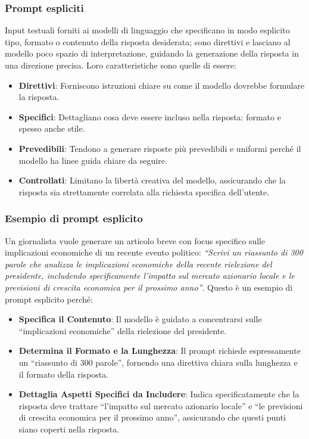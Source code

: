         \subsubsection{Prompt espliciti}
            Input testuali forniti ai modelli di linguaggio che specificano in modo esplicito tipo, formato o contenuto della risposta desiderata; sono direttivi e lasciano al modello poco spazio di interpretazione, guidando la generazione della risposta in una direzione precisa. Loro caratteristiche sono quelle di essere:
            \begin{itemize}
                \item \textbf{Direttivi}: Forniscono istruzioni chiare su come il modello dovrebbe formulare la risposta.

                \item \textbf{Specifici}: Dettagliano cosa deve essere incluso nella risposta: formato e spesso anche stile.
                
                \item \textbf{Prevedibili}: Tendono a generare risposte più prevedibili e uniformi perché il modello ha linee guida chiare da seguire.
                
                \item \textbf{Controllati}: Limitano la libertà creativa del modello, assicurando che la risposta sia strettamente correlata alla richiesta specifica dell'utente.
            \end{itemize}
            
        \subsubsection{Esempio di prompt esplicito}
            Un giornalista vuole generare un articolo breve con focus specifico sulle implicazioni economiche di un recente evento politico: \textit{``Scrivi un riassunto di 300 parole che analizza le implicazioni economiche della recente rielezione del presidente, includendo specificamente l'impatto sul mercato azionario locale e le previsioni di crescita economica per il prossimo anno''}. Questo è un esempio di prompt esplicito perché:
            \begin{itemize}
                \item \textbf{Specifica il Contenuto}: Il modello è guidato a concentrarsi sulle ``implicazioni economiche'' della rielezione del presidente.
            
                \item \textbf{Determina il Formato e la Lunghezza}: Il prompt richiede espressamente un ``riassunto di 300 parole'', fornendo una direttiva chiara sulla lunghezza e il formato della risposta.
            
                \item \textbf{Dettaglia Aspetti Specifici da Includere}: Indica specificatamente che la risposta deve trattare ``l'impatto sul mercato azionario locale'' e ``le previsioni di crescita economica per il prossimo anno'', assicurando che questi punti siano coperti nella risposta.
            \end{itemize}
            
